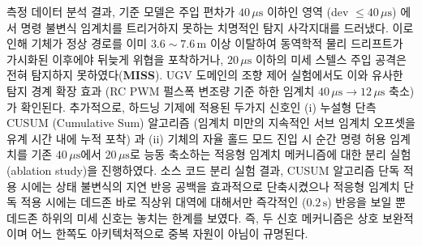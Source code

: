 \noindent 측정 데이터 분석 결과, 기준 모델은 주입 편차가 $40\,\mu\text{s}$ 이하인 영역 (dev $\le 40\,\mu\text{s}$) 에서 명령 불변식 임계치를 트리거하지 못하는 치명적인 탐지 사각지대를 드러냈다. 이로 인해 기체가 정상 경로를 이미 $3.6\sim7.6\,\text{m}$ 이상 이탈하여 동역학적 물리 드리프트가 가시화된 이후에야 뒤늦게 위협을 포착하거나, $20\,\mu\text{s}$ 이하의 미세 스텔스 주입 공격은 전혀 탐지하지 못하였다(\textbf{MISS}). UGV 도메인의 조향 제어 실험에서도 이와 유사한 탐지 경계 확장 효과 (RC PWM 펄스폭 변조량 기준 하한 임계치 $40\,\mu\text{s} \rightarrow 12\,\mu\text{s}$ 축소) 가 확인된다.
추가적으로, 하드닝 기제에 적용된 두가지 신호인 (i) 누설형 단측 CUSUM (Cumulative Sum) 알고리즘 (임계치 미만의 지속적인 서브 임계치 오프셋을 유계 시간 내에 누적 포착) 과 (ii) 기체의 자율 홀드 모드 진입 시 순간 명령 허용 임계치를 기존 $40\,\mu\text{s}$에서 $20\,\mu\text{s}$로 능동 축소하는 적응형 임계치 메커니즘에 대한 분리 실험 (ablation study)을 진행하였다.
%
소스 코드 분리 실험 결과, CUSUM 알고리즘 단독 적용 시에는 상태 불변식의 지연 반응 공백을 효과적으로 단축시켰으나 적응형 임계치 단독 적용 시에는 데드존 바로 직상위 대역에 대해서만 즉각적인 ($0.2\,\text{s}$) 반응을 보일 뿐 데드존 하위의 미세 신호는 놓치는 한계를 보였다. 즉, 두 신호 메커니즘은 상호 보완적이며 어느 한쪽도 아키텍처적으로 중복 자원이 아님이 규명된다. 



